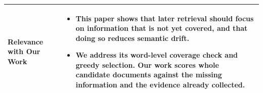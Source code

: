 \documentclass[12pt,a4paper]{report}
\begin{document}
\begin{longtable}{|p{1.25in}|p{5.15in}|}
\textbf{Relevance with Our Work} &
\begin{itemize}[leftmargin=0.18in,itemsep=0.05in,topsep=0pt,parsep=0pt]
\item This paper shows that later retrieval should focus on information that is not yet covered, and that doing so reduces semantic drift.
\item We address its word-level coverage check and greedy selection. Our work scores whole candidate documents against the missing information and the evidence already collected.
\end{itemize} \\ \hline
\end{longtable}
\clearpage

\end{document}
